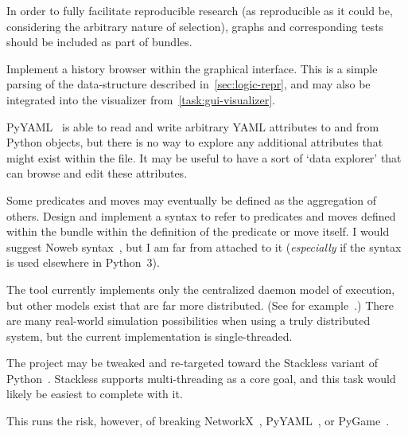 \begin{task}
  \label{task:bundle-graphs}
  In order to fully facilitate reproducible research
    (as reproducible as it could be,
      considering the arbitrary nature of selection),
    graphs and corresponding tests should be included as part of bundles.
\end{task}

\begin{task}
  \label{task:save-history}
  Implement a history browser within the graphical interface.
  This is a simple parsing of the data-structure described in~\autoref{sec:logic-repr},
    and may also be integrated into the visualizer from~\autoref{task:gui-visualizer}.
\end{task}

\begin{task}
  \label{task:arbitrary-attributes}
  PyYAML~\autocite{pyyaml} is able to read and write arbitrary YAML
  attributes to and from Python objects, but there is no way to explore
  any additional attributes that might exist within the file.
  It may be useful to have a sort of \enquote*{data explorer} that can
    browse and edit these attributes.
\end{task}

\begin{task}
  \label{task:magical-references}
  Some predicates and moves may eventually be defined as the aggregation of others.
  Design and implement a syntax to refer to predicates and moves defined within the bundle
    within the definition of the predicate or move itself.
  I would suggest Noweb syntax~\autocite{noweb}, but I am far from attached to it
    (\emph{especially} if the syntax is used elsewhere in Python~3).
\end{task}

\begin{task}
  \label{task:stackless}
  The tool currently implements only the centralized daemon model of execution,
    but other models exist that are far more distributed.
  (See for example~\autocite{ssa:dist}.)
  There are many real-world simulation possibilities when using a truly distributed system,
    but the current implementation is single-threaded.

  The project may be tweaked and re-targeted toward the Stackless variant of Python~\autocite{stackless}.
  Stackless supports multi-threading as a core goal, and this task would likely be easiest to complete with it.

  This runs the risk, however, of breaking NetworkX~\autocite{hagberg:networkx}, PyYAML~\autocite{pyyaml}, or PyGame~\autocite{pygame}.
\end{task}

